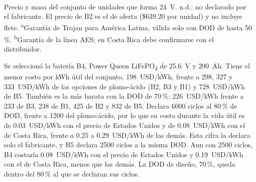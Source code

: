 \begin{table}[!th]
\caption{Matriz comparativa de las baterías (módulo de \SI{24}{V})}
\label{tab:matriz}
\centering
\footnotesize
\setlength{\tabcolsep}{4pt}
\\[2pt]
{\footnotesize Precio y masa del conjunto de unidades que forma \SI{24}{V}. n.d.: no declarado por el fabricante. El precio de B2 es el de oferta (\$639.20 por unidad) y no incluye flete.
\textsuperscript{a}Garantía de Trojan para América Latina, válida solo con DOD de hasta 50\,\%. \textsuperscript{b}Garantía de la línea AES; en Costa Rica debe confirmarse con el distribuidor.}
\end{table}

Se seleccionó la batería B4, Power Queen LiFePO\textsubscript{4} de \SI{25.6}{V} y \SI{200}{Ah}. Tiene el menor costo por kWh útil del conjunto, \SI{198}{USD/kWh}, frente a 298, 327 y \SI{333}{USD/kWh} de las opciones de plomo-ácido (B2, B3 y B1) y \SI{728}{USD/kWh} de B5. También es la más barata con la DOD de 70\,\%: \SI{226}{USD/kWh} frente a 233 de B3, 238 de B1, 425 de B2 y 832 de B5. Declara 6000 ciclos al 80\,\% de DOD, frente a 1200 del plomo-ácido, por lo que su costo durante la vida útil es de \SI{0.03}{USD/kWh} con el precio de Estados Unidos y de \SI{0.08}{USD/kWh} con el de Costa Rica, frente a 0.25 a \SI{0.29}{USD/kWh} de las demás. Esta cifra la declara solo el fabricante, y B5 declara 2500 ciclos a la misma DOD. Aun con 2500 ciclos, B4 costaría \SI{0.08}{USD/kWh} con el precio de Estados Unidos y \SI{0.19}{USD/kWh} con el de Costa Rica, menos que las demás. La DOD de diseño, 70\,\%, queda dentro del 80\,\% al que se declaran sus ciclos.

